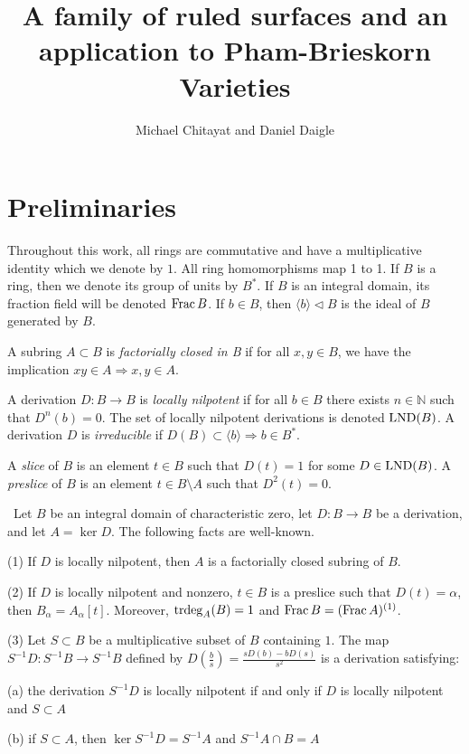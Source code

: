 \documentclass[12pt]{amsart}
\theoremstyle{plain}
\theoremstyle{definition}
\newcommand{\trdeg}{	\operatorname{{\rm trdeg}}}
\newcommand{\Frac}{		\operatorname{{\rm Frac}}}
\newcommand{\lb}{\langle}
\newcommand{\rb}{\rangle}
\newcommand{\Nat}{\ensuremath{\mathbb{N}}}
\newcommand{\lnd}{\operatorname{{\rm LND}}}
\begin{document}
\renewcommand{\baselinestretch}{1.07}




\title{A family of ruled surfaces and an application to Pham-Brieskorn Varieties}


\author{Michael Chitayat and Daniel Daigle}

\maketitle
  
\vfuzz=2pt


\section{Preliminaries}

Throughout this work, all rings are commutative and have a multiplicative identity which we denote by $1$. All ring homomorphisms map 1 to 1. If $B$ is a ring, then we denote its group of units by $B^*$. If $B$ is an integral domain, its fraction field will be denoted $\Frac B$. If $b \in B$, then $\lb b \rb \lhd B$ is the ideal of $B$ generated by $B$.  

A subring $A \subset B$ is \textit{factorially closed in B} if for all $x,y \in B$, we have the implication $xy \in A \Rightarrow x,y \in A$. 

A derivation $D : B \to B$ is \textit{locally nilpotent} if for all $b \in B$ there exists $n \in \Nat$ such that $D^n(b) = 0$.  The set of locally nilpotent derivations is denoted $\lnd(B)$. A derivation $D$ is \textit{irreducible} if $D(B) \subset \lb b \rb \Rightarrow b \in B^*$.

A \textit{slice} of $B$ is an element $t \in B$ such that $D(t) = 1$ for some $D \in \lnd(B)$.  A \textit{preslice} of $B$ is an element $t \in B \setminus A$ such that $D^2(t) = 0$.     

\begin{subsection}\  	
	Let $B$ be an integral domain of characteristic zero, let $D : B \to B$ be a derivation, and let $A = \ker D$. The following facts are well-known. 
	
	(1) If $D$ is locally nilpotent, then $A$ is a factorially closed subring of $B$. 
	
	(2) If $D$ is locally nilpotent and nonzero, $t \in B$ is a preslice such that $D(t) = \alpha$, then $B_\alpha = A_\alpha[t]$. Moreover, $\trdeg_A(B) = 1$ and $\Frac B  = (\Frac A)^{(1)}$.
	
	(3) Let $S \subset B$ be a multiplicative subset of $B$ containing $1$. The map $S^{-1}D : S^{-1} B \to S^{-1} B$ defined by $D(\frac{b}{s}) = \frac{sD(b)-bD(s)}{s^2}$ is a derivation satisfying:
	
	\quad (a) the derivation $S^{-1}D$ is locally nilpotent if and only if $D$ is locally nilpotent and $S \subset A$
	
	\quad (b) if $S \subset A$, then $\ker S^{-1}D = S^{-1}A$ and $S^{-1}A \cap B = A$
\end{subsection}
\end{document}
